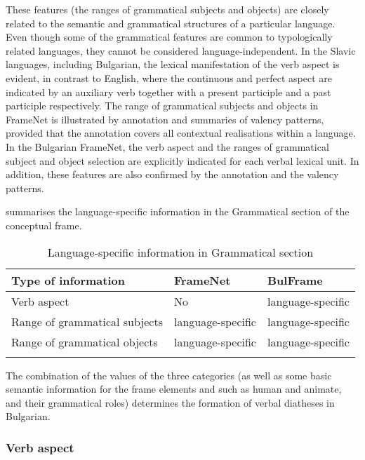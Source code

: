 \documentclass[output=paper,colorlinks,citecolor=brown]{langscibook}
\begin{document}
These features (the ranges of grammatical subjects and objects) are closely related to the semantic and grammatical structures of a particular language. Even though some of the grammatical features are common to typologically related languages, they cannot be considered language-independent.
In the Slavic languages, including Bulgarian, the lexical manifestation of the verb aspect is evident, in contrast to English, where the continuous and perfect aspect are indicated by an auxiliary verb together with a present participle and a past participle respectively.
The range of grammatical subjects and objects in FrameNet is illustrated by annotation and summaries of valency patterns, provided that the annotation covers all contextual realisations within a language. In the Bulgarian FrameNet, the verb aspect and the ranges of grammatical subject and object selection are explicitly indicated for each verbal lexical unit. In addition, these features are also confirmed by the annotation and the valency patterns.

 summarises the language-specific information in the Grammatical section of the conceptual frame.

\begin{table}
    \begin{tabular}{lll}
    \lsptoprule
       Type of information & FrameNet  & BulFrame  \\\midrule
       Verb aspect & No & language-specific\\
       Range of grammatical subjects & language-specific & language-specific\\
       Range of grammatical objects & language-specific & language-specific\\
     \lspbottomrule
    \end{tabular}
    \caption{Language-specific information in Grammatical section}
     \label{tab:my_label4}
 \end{table} 

 \newpage
The combination of the values of the three categories (as well as some basic semantic information for the frame elements  and  such as  human and animate, and their grammatical roles) determines the formation of verbal diatheses in Bulgarian.

\subsubsection{Verb aspect}
\end{document}
